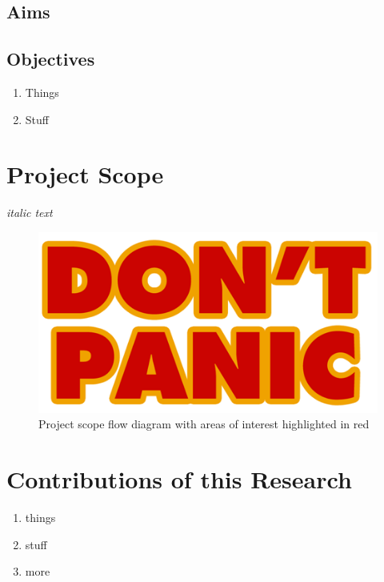 \subsection{Aims}

\subsection{Objectives}

\begin{enumerate}
	\item Things
	
	\item Stuff
	

\end{enumerate}



\section{Project Scope}

 \textit{italic text}  
 
\begin{figure} [ht]
	\centering    
	\includegraphics[width=120mm]{Chapter1/Figs/subfolder/dont-panic.png}
	\caption[Project scope flow diagram with areas of interest highlighted in red]{Project scope flow diagram with areas of interest highlighted in red}
	\label{fig:Scope}
\end{figure}



\section{Contributions of this Research}
\begin{enumerate}
	\item things
	\item stuff
	\item more
\end{enumerate}


